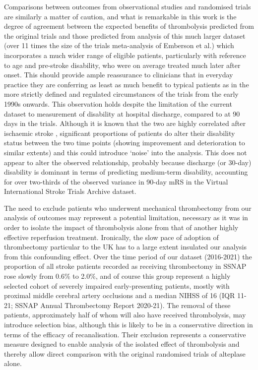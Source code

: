Comparisons between outcomes from observational studies and randomised trials are similarly a matter of caution, and what is remarkable in this work is the degree of agreement between the expected benefits of thrombolysis predicted from the original trials and those predicted from analysis of this much larger dataset (over 11 times the size of the trials meta-analysis of Emberson et al.\cite{emberson_effect_2014}) which incorporates a much wider range of eligible patients, particularly with reference to age and pre-stroke disability, who were on average treated much later after onset. This should provide ample reassurance to clinicians that in everyday practice they are conferring as least as much benefit to typical patients as in the more strictly defined and regulated circumstances of the trials from the early 1990s onwards. This observation holds despite the limitation of the current dataset to measurement of disability at hospital discharge, compared to at 90 days in the trials. Although it is known that the two are highly correlated after ischaemic stroke \cite{elhabr_predicting_2021, ovbiagele_disability_2010}, significant proportions of patients do alter their disability status between the two time points (showing improvement and deterioration to similar extents\cite{elhabr_predicting_2021}) and this could introduce ‘noise’ into the analysis. This does not appear to alter the observed relationship, probably because discharge (or 30-day) disability is dominant in terms of predicting medium-term disability, accounting for over two-thirds of the observed variance in 90-day mRS in the Virtual International Stroke Trials Archive dataset\cite{ovbiagele_disability_2010}.

The need to exclude patients who underwent mechanical thrombectomy from our analysis of outcomes may represent a potential limitation, necessary as it was in order to isolate the impact of thrombolysis alone from that of another highly effective reperfusion treatment. Ironically, the slow pace of adoption of thrombectomy particular to the UK has to a large extent insulated our analysis from this confounding effect. Over the time period of our dataset (2016-2021) the proportion of all stroke patients recorded as receiving thrombectomy in SSNAP rose slowly from 0.6\% to 2.0\%, and of course this group represent a highly selected cohort of severely impaired early-presenting patients, mostly with proximal middle cerebral artery occlusions and a median NIHSS of 16 (IQR 11-21; SSNAP Annual Thrombectomy Report 2020-21\cite{sentinel_stroke_national_audit_programme_sentinel_2021}). The removal of these patients, approximately half of whom will also have received thrombolysis, may introduce selection bias, although this is likely to be in a conservative direction in terms of the efficacy of recanalisation. Their exclusion represents a conservative measure designed to enable analysis of the isolated effect of thrombolysis and thereby allow direct comparison with the original randomised trials of alteplase alone.